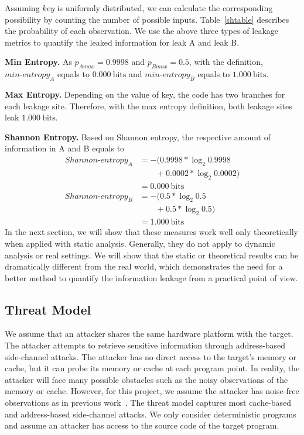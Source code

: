 {Assuming $\mathit{key}$ is uniformly distributed, we can calculate the corresponding
possibility by counting the number of possible inputs. Table~\ref{shtable}
describes the probability of each observation. We use the above three types of 
leakage metrics to quantify the leaked information for leak A and leak B.

\vspace{3pt}
\textbf{Min Entropy.}
As $p_{A\mathit{max}} = 0.9998$ and $p_{B\mathit{max}} = 0.5$, 
with the definition, $\mathit{min\text{-}entropy_A}$ equals to
$0.000\ \mathrm{bits}$ and $\mathit{min\text{-}entropy_B}$ equals to
$1.000\ \mathrm{bits}$.

\textbf{Max Entropy.}
Depending on the value of key, the code has two branches for each leakage site. 
Therefore, with the max entropy definition, both leakage sites leak $1.000\ \mathrm{bits}$.

\textbf{Shannon Entropy.}
Based on Shannon entropy, the respective amount of information in A and B equals to
{\footnotesize
\begin{align*}
    \mathit{Shannon\text{-}entropy_A} & = -(0.9998*\log_{2}0.9998      \\
                                    & \qquad+ 0.0002*\log_{2}0.0002)  \\
                                    & = 0.000\ \mathrm{bits}         \\
    \mathit{Shannon\text{-}entropy_B} & = -(0.5*\log_{2}0.5      \\
                                    & \qquad+ 0.5*\log_{2}0.5)        \\
                                    & = 1.000\ \mathrm{bits}                             
\end{align*}
}
In the next section, we will show that these measures work well only
theoretically when applied with static analysis. 
Generally, they do not apply to dynamic analysis or real
settings. We will show that the static or theoretical results can be
dramatically different from the real world, which demonstrates the need for a better method to
quantify the information leakage from a practical point of view. 
}

\subsection{Threat Model}
We assume that an attacker shares the same hardware platform with the target.
The attacker attempts to retrieve sensitive information through address-based
side-channel attacks. The attacker has no direct access to the target's memory or cache,
but it can probe its memory or cache at each program point. In reality, the
attacker will face many possible obstacles such as the noisy observations 
of the memory or cache. However, for this project, we assume
the attacker has noise-free observations as in previous work~\cite{203878,182946,Brotzman19Casym}. 
The threat model captures most cache-based and address-based side-channel attacks. 
We only consider deterministic programs and assume an attacker 
has access to the source code  of the target program.
